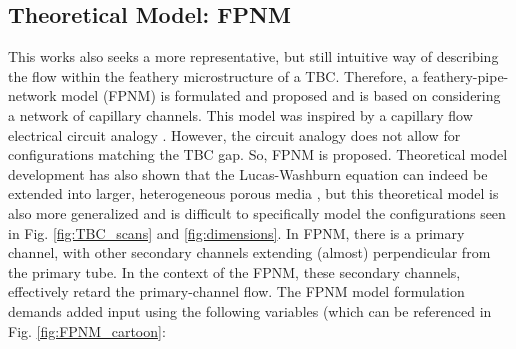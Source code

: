 \documentclass[%
 aip,
 amsmath,amssymb,
 reprint,%
floatfix]{revtex4-1}
\begin{document}



\subsection{Theoretical Model: FPNM}
\label{sec:pipeNetworkMethod}
This works also seeks a more representative, but still intuitive way of describing the flow within the feathery microstructure of a TBC. Therefore, a feathery-pipe-network model (FPNM)  is formulated and proposed and is based on considering a network of capillary channels. This model was inspired by a capillary flow electrical circuit analogy \cite{Mikaelian2020}. However, the circuit analogy does not allow for configurations matching the TBC gap. So, FPNM is proposed. Theoretical model development has also shown that the Lucas-Washburn equation can indeed be extended into larger, heterogeneous porous media \cite{Cai2021, WAGHMARE2010561}, but this theoretical model is also more generalized and is difficult to specifically model the configurations seen in Fig. \ref{fig:TBC_scans} and \ref{fig:dimensions}.
In FPNM, there is a primary channel, with other secondary channels extending (almost) perpendicular from the primary tube. In the context of the FPNM, these secondary channels, effectively retard the primary-channel flow. The FPNM model formulation demands added input using the following variables (which can be referenced in Fig. \ref{fig:FPNM_cartoon}:
\end{document}
